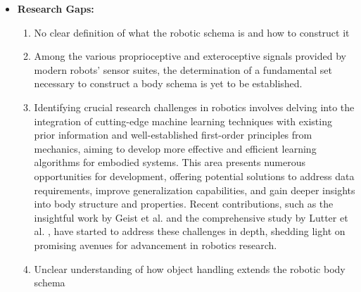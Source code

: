 \documentclass[12pt, a4paper]{article}
\begin{document}
\begin{itemize}
	
	\item \textbf{Research Gaps:}
	\begin{enumerate}
		\item No clear definition of what the robotic schema is and how to construct it
		
		\item Among the various proprioceptive and exteroceptive signals provided by modern robots' sensor suites, the determination of a fundamental set necessary to construct a body schema is yet to be established.		
		
		
		\item Identifying crucial research challenges in robotics involves delving into the integration of cutting-edge machine learning techniques with existing prior information and well-established first-order principles from mechanics, aiming to develop more effective and efficient learning algorithms for embodied systems. This area presents numerous opportunities for development, offering potential solutions to address data requirements, improve generalization capabilities, and gain deeper insights into body structure and properties. Recent contributions, such as the insightful work by Geist et al. \cite{Geist2021Structuredlearningrigid} and the comprehensive study by Lutter et al. \cite{Lutter2023Combiningphysicsdeep}, have started to address these challenges in depth, shedding light on promising avenues for advancement in robotics research.
		
				

		\item Unclear understanding of how object handling extends the robotic body schema
		

\end{enumerate}
\end{itemize}
\end{document}
